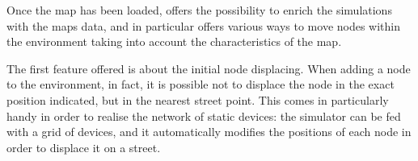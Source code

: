 \documentclass[12pt,a4paper,twoside,openright]{book}
\begin{document}
Once the map has been loaded, \alchemist{} offers the possibility to enrich the simulations with the maps data, and in particular offers various ways to move nodes within the environment taking into account the characteristics of the map.

The first feature offered is about the initial node displacing.
%
When adding a node to the environment, in fact, it is possible not to displace the node in the exact position indicated, but in the nearest street point.
%
This comes in particularly handy in order to realise the network of static devices: the simulator can be fed with a grid of devices, and it automatically modifies the positions of each node in order to displace it on a street.

 \begin{figure}
 \centering
~
~
\end{figure}
\end{document}
